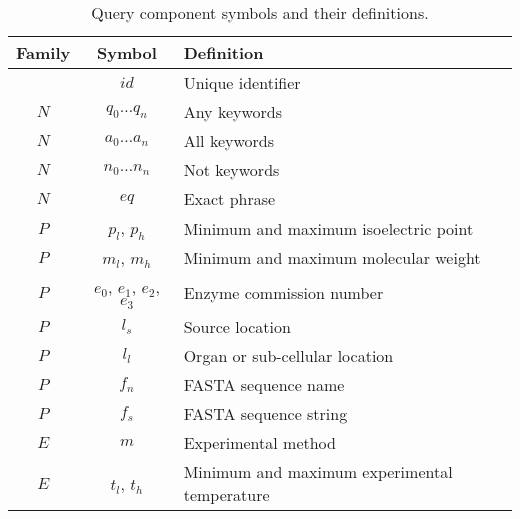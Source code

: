 \begin{table}[H]
\centering
\begin{tabular}{| c | c | l |}
\hline
\textbf{Family} & \textbf{Symbol} & \textbf{Definition}\\
\hline
& $id$ & Unique identifier\\
$N$ & $q_0 \ldots q_n$ & Any keywords\\
$N$ & $a_0 \ldots a_n$ & All keywords\\
$N$ & $n_0 \ldots n_n$ & Not keywords\\
$N$ & $eq$ & Exact phrase\\
$P$ & $p_l$, $p_h$ & Minimum and maximum isoelectric point\\
$P$ & $m_l$, $m_h$ & Minimum and maximum molecular weight\\
$P$ & $e_0$, $e_1$, $e_2$, $e_3$ & Enzyme commission number\\
$P$ & $l_s$ & Source location\\
$P$ & $l_l$ & Organ or sub-cellular location\\
$P$ & $f_n$ & FASTA sequence name\\
$P$ & $f_s$ & FASTA sequence string\\
$E$ & $m$ & Experimental method\\
$E$ & $t_l$, $t_h$ & Minimum and maximum experimental temperature\\
\hline
\end{tabular}
\caption[Query component symbols and their definitions]{Query component symbols and their definitions.}
\label{tab:query-components}
\end{table}


\newpage

